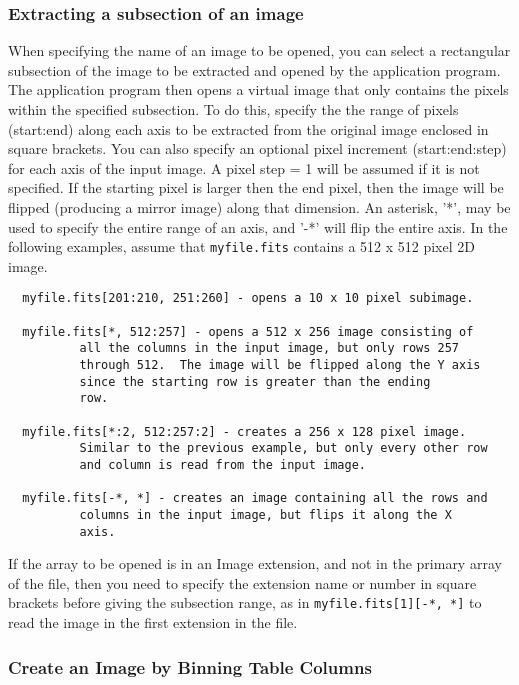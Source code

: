 \documentclass[11pt]{article}
\begin{document}
\subsubsection{Extracting a subsection of an image}

When specifying the name of an image to be opened, you can select a
rectangular subsection of the image to be extracted and opened by the
application program.  The application program then opens a virtual
image that only contains the pixels within the specified subsection.
To do this, specify the the range of pixels (start:end) along each axis
to be extracted from the original image enclosed in square brackets.
You can also specify an optional pixel increment (start:end:step) for
each axis of the input image.  A pixel step = 1 will be assumed if it
is not specified.  If the starting pixel is larger then the end pixel,
then the image will be flipped (producing a mirror image) along that
dimension.  An asterisk, '*', may be used to specify the entire range
of an axis, and '-*' will flip the entire axis.  In the following
examples, assume that {\tt myfile.fits} contains a 512 x 512 pixel 2D
image.

\begin{verbatim}
  myfile.fits[201:210, 251:260] - opens a 10 x 10 pixel subimage.

  myfile.fits[*, 512:257] - opens a 512 x 256 image consisting of
	      all the columns in the input image, but only rows 257
	      through 512.  The image will be flipped along the Y axis
	      since the starting row is greater than the ending
	      row.

  myfile.fits[*:2, 512:257:2] - creates a 256 x 128 pixel image.
	      Similar to the previous example, but only every other row
	      and column is read from the input image.

  myfile.fits[-*, *] - creates an image containing all the rows and
	      columns in the input image, but flips it along the X
	      axis.
\end{verbatim}

If the array to be opened is in an Image extension, and not in the
primary array of the file, then you need to specify the extension
name or number in square brackets before giving the subsection range,
as in {\tt  myfile.fits[1][-*, *]} to read the image in the
first extension in the file.

\subsubsection{Create an Image by Binning Table Columns}
\end{document}
